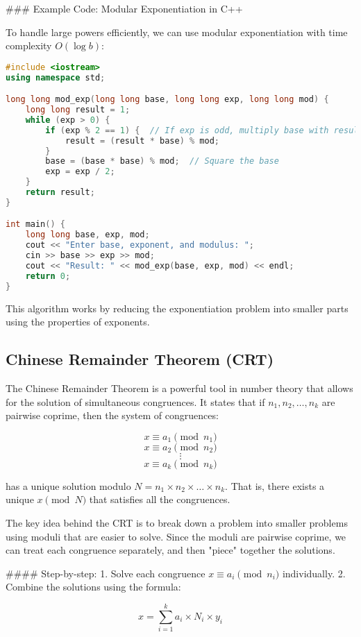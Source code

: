 \documentclass[10pt,a4paper]{article}
\begin{document}
### Example Code: Modular Exponentiation in C++

To handle large powers efficiently, we can use modular exponentiation with time complexity \(O(\log b)\):

\begin{lstlisting}[language=C++]
#include <iostream>
using namespace std;

long long mod_exp(long long base, long long exp, long long mod) {
    long long result = 1;
    while (exp > 0) {
        if (exp % 2 == 1) {  // If exp is odd, multiply base with result
            result = (result * base) % mod;
        }
        base = (base * base) % mod;  // Square the base
        exp = exp / 2;
    }
    return result;
}

int main() {
    long long base, exp, mod;
    cout << "Enter base, exponent, and modulus: ";
    cin >> base >> exp >> mod;
    cout << "Result: " << mod_exp(base, exp, mod) << endl;
    return 0;
}
\end{lstlisting}

This algorithm works by reducing the exponentiation problem into smaller parts using the properties of exponents.


\subsection*{Chinese Remainder Theorem (CRT)}

The Chinese Remainder Theorem is a powerful tool in number theory that allows for the solution of simultaneous congruences. It states that if \(n_1, n_2, \dots, n_k\) are pairwise coprime, then the system of congruences:

\[
x \equiv a_1 \pmod{n_1}
\]
\[
x \equiv a_2 \pmod{n_2}
\]
\[
\vdots
\]
\[
x \equiv a_k \pmod{n_k}
\]

has a unique solution modulo \(N = n_1 \times n_2 \times \dots \times n_k\). That is, there exists a unique \(x \pmod{N}\) that satisfies all the congruences.

The key idea behind the CRT is to break down a problem into smaller problems using moduli that are easier to solve. Since the moduli are pairwise coprime, we can treat each congruence separately, and then "piece" together the solutions.

#### Step-by-step:
1. Solve each congruence \(x \equiv a_i \pmod{n_i}\) individually.
2. Combine the solutions using the formula:

\[
x = \sum_{i=1}^{k} a_i \times N_i \times y_i
\]
\end{document}

